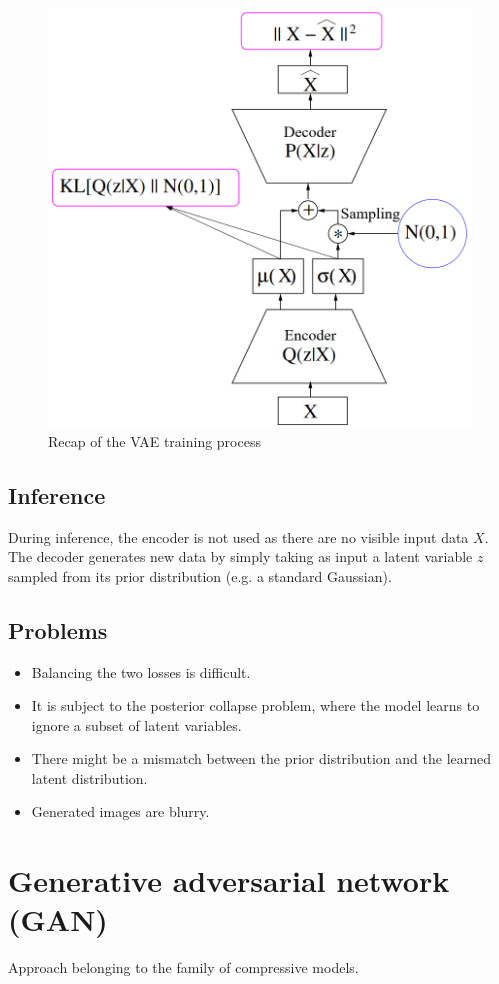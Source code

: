 \begin{figure}[H]
    \centering
    \includegraphics[width=0.4\linewidth]{./img/vae_training.png}
    \caption{Recap of the VAE training process}
\end{figure}



\subsection{Inference}

During inference, the encoder is not used as there are no visible input data $X$.
The decoder generates new data by simply taking as input a latent variable $z$ sampled from its prior distribution (e.g. a standard Gaussian).



\subsection{Problems}

\begin{itemize}
    \item Balancing the two losses is difficult.
    \item It is subject to the posterior collapse problem, where the model learns to ignore a subset of latent variables.
    \item There might be a mismatch between the prior distribution and the learned latent distribution.
    \item Generated images are blurry.
\end{itemize}



\section{Generative adversarial network (GAN)}

Approach belonging to the family of compressive models.

